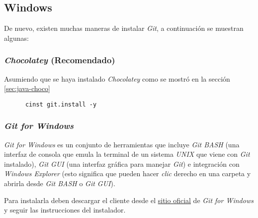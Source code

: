 \subsection{Windows}
  De nuevo, existen muchas maneras de instalar \textit{Git}, a continuación se 
  muestran algunas:

  \subsubsection{\textit{Chocolatey} (Recomendado)}
    Asumiendo que se haya instalado \textit{Chocolatey} como se mostró en la sección
    \ref{sec:java-choco}

    \begin{verbatim}
      cinst git.install -y
    \end{verbatim}

  \subsubsection{\textit{Git for Windows}}
    \textit{Git for Windows} es un conjunto de herramientas que incluye \textit{Git 
    BASH} (una interfaz de consola que emula la terminal de un sistema \textit{UNIX} 
    que viene con \textit{Git} instalado), \textit{Git GUI} (una interfaz gráfica para 
    manejar \textit{Git}) e integración con \textit{Windows Explorer} (esto significa 
    que pueden hacer \textit{clic} derecho en una carpeta y abrirla desde \textit{Git 
    BASH} o \textit{Git GUI}).
    
    Para instalarla deben descargar el cliente desde el 
    \href{https://gitforwindows.org}{sitio oficial} de \textit{Git for Windows} y 
    seguir las instrucciones del instalador.
%
